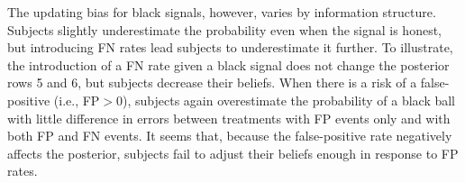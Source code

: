 \documentclass[12pt,a4paper]{article}
\begin{document}
The updating bias for black signals, however, varies by information structure. Subjects slightly underestimate the probability even when the signal is honest, but introducing FN rates lead subjects to underestimate it further. To illustrate, the introduction of a FN rate given a black signal does not change the posterior rows 5 and 6, but subjects decrease their beliefs. When there is a risk of a false-positive (i.e., FP$>$0), subjects again overestimate the probability of a black ball with little difference in errors between treatments with FP events only and with both FP and FN events. It seems that, because the false-positive rate negatively affects the posterior, subjects fail to adjust their beliefs enough in response to FP rates.




\begin{table}[H]\centering 
\caption{Average Updating Error by Signal Type} 
\label{tab:nonparError}
\end{table}
\end{document}
